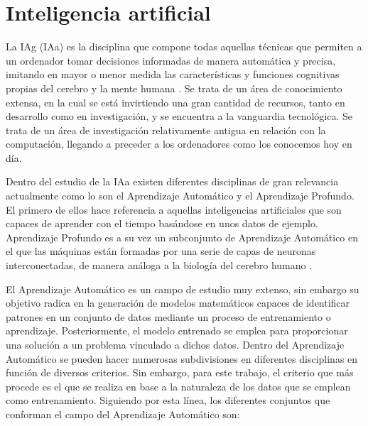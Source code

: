 \section{Inteligencia artificial}

La \gls{IAg} (\gls{IAa}) es la disciplina que compone todas
aquellas técnicas que permiten a un ordenador tomar decisiones informadas de
manera automática y precisa, imitando en mayor o menor medida las
características y funciones cognitivas propias del cerebro y la mente
humana \cite{McKinseyAI}. Se trata de un área de conocimiento extensa, en la cual se está
invirtiendo una gran cantidad de recursos, tanto en desarrollo como en
investigación, y se encuentra a la vanguardia tecnológica. Se trata de un área
de investigación relativamente antigua en relación con la computación, llegando
a preceder a los ordenadores como los conocemos hoy en día.

Dentro del estudio de la \gls{IAa} existen diferentes disciplinas de gran
relevancia actualmente como lo son el Aprendizaje Automático y el Aprendizaje
Profundo. El primero de ellos hace referencia a aquellas inteligencias
artificiales que son capaces de aprender con el tiempo basándose en unos datos
de ejemplo. Aprendizaje Profundo es a su vez un subconjunto de Aprendizaje
Automático en el que las máquinas están formadas por una serie de capas de
neuronas interconectadas, de manera análoga a la biología del cerebro humano
\cite{ieeeAI}.

El Aprendizaje Automático es un campo de estudio muy extenso, sin embargo su
objetivo radica en la generación de modelos matemáticos capaces de identificar
patrones en un conjunto de datos mediante un proceso de entrenamiento o
aprendizaje. Posteriormente, el modelo entrenado se emplea para proporcionar una
solución a un problema vinculado a dichos datos. Dentro del Aprendizaje
Automático se pueden hacer numerosas subdivisiones en diferentes disciplinas en
función de diversos criterios. Sin embargo, para este trabajo, el criterio que más procede es el que se realiza en base a la
naturaleza de los datos que se emplean como entrenamiento. Siguiendo por esta
línea, los diferentes conjuntos que conforman el campo del Aprendizaje
Automático son:

